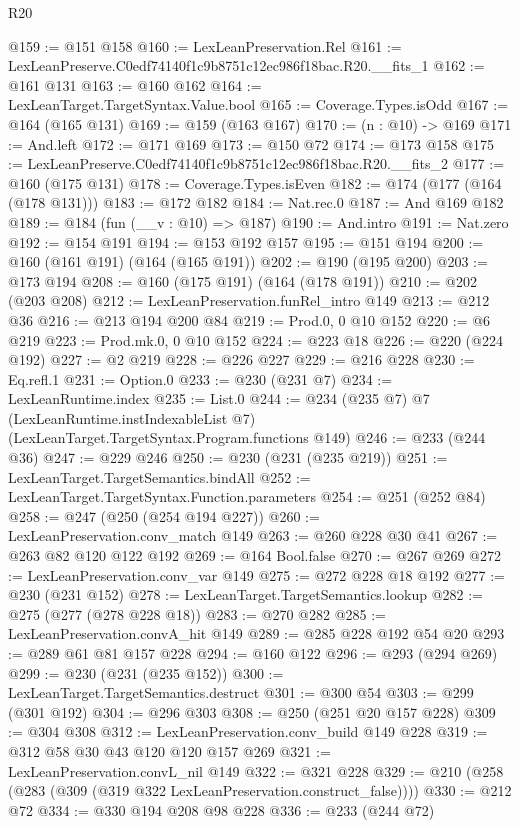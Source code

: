 \begin{lexlean}{R20}
\begin{coremodule}
@159 := @151 @158
@160 := LexLeanPreservation.Rel
@161 := LexLeanPreserve.C0edf74140f1c9b8751c12ec986f18bac.R20.__fits_1
@162 := @161 @131
@163 := @160 @162
@164 := LexLeanTarget.TargetSyntax.Value.bool
@165 := Coverage.Types.isOdd
@167 := @164 (@165 @131)
@169 := @159 (@163 @167)
@170 := (n : @10) -> @169
@171 := And.left
@172 := @171 @169
@173 := @150 @72
@174 := @173 @158
@175 := LexLeanPreserve.C0edf74140f1c9b8751c12ec986f18bac.R20.__fits_2
@177 := @160 (@175 @131)
@178 := Coverage.Types.isEven
@182 := @174 (@177 (@164 (@178 @131)))
@183 := @172 @182
@184 := Nat.rec.{0}
@187 := And @169 @182
@189 := @184 (fun (__v : @10) => @187)
@190 := And.intro
@191 := Nat.zero
@192 := @154 @191
@194 := @153 @192 @157
@195 := @151 @194
@200 := @160 (@161 @191) (@164 (@165 @191))
@202 := @190 (@195 @200)
@203 := @173 @194
@208 := @160 (@175 @191) (@164 (@178 @191))
@210 := @202 (@203 @208)
@212 := LexLeanPreservation.funRel_intro @149
@213 := @212 @36
@216 := @213 @194 @200 @84
@219 := Prod.{0, 0} @10 @152
@220 := @6 @219
@223 := Prod.mk.{0, 0} @10 @152
@224 := @223 @18
@226 := @220 (@224 @192)
@227 := @2 @219
@228 := @226 @227
@229 := @216 @228
@230 := Eq.refl.{1}
@231 := Option.{0}
@233 := @230 (@231 @7)
@234 := LexLeanRuntime.index
@235 := List.{0}
@244 := @234
    (@235 @7)
    @7
    (LexLeanRuntime.instIndexableList @7)
    (LexLeanTarget.TargetSyntax.Program.functions @149)
@246 := @233 (@244 @36)
@247 := @229 @246
@250 := @230 (@231 (@235 @219))
@251 := LexLeanTarget.TargetSemantics.bindAll
@252 := LexLeanTarget.TargetSyntax.Function.parameters
@254 := @251 (@252 @84)
@258 := @247 (@250 (@254 @194 @227))
@260 := LexLeanPreservation.conv_match @149
@263 := @260 @228 @30 @41
@267 := @263 @82 @120 @122 @192
@269 := @164 Bool.false
@270 := @267 @269
@272 := LexLeanPreservation.conv_var @149
@275 := @272 @228 @18 @192
@277 := @230 (@231 @152)
@278 := LexLeanTarget.TargetSemantics.lookup
@282 := @275 (@277 (@278 @228 @18))
@283 := @270 @282
@285 := LexLeanPreservation.convA_hit @149
@289 := @285 @228 @192 @54 @20
@293 := @289 @61 @81 @157 @228
@294 := @160 @122
@296 := @293 (@294 @269)
@299 := @230 (@231 (@235 @152))
@300 := LexLeanTarget.TargetSemantics.destruct
@301 := @300 @54
@303 := @299 (@301 @192)
@304 := @296 @303
@308 := @250 (@251 @20 @157 @228)
@309 := @304 @308
@312 := LexLeanPreservation.conv_build @149 @228
@319 := @312 @58 @30 @43 @120 @120 @157 @269
@321 := LexLeanPreservation.convL_nil @149
@322 := @321 @228
@329 := @210 (@258 (@283 (@309 (@319 @322 LexLeanPreservation.construct_false))))
@330 := @212 @72
@334 := @330 @194 @208 @98 @228
@336 := @233 (@244 @72)

\end{coremodule}
\end{lexlean}
